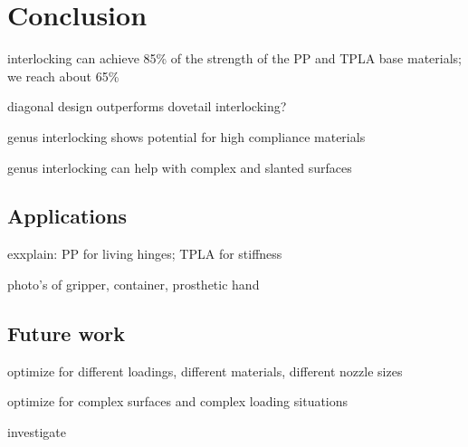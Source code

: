 \section{Conclusion}

interlocking can achieve 85\% of the strength of the PP and TPLA base materials; we reach about 65\%

diagonal design outperforms dovetail interlocking?

genus interlocking shows potential for high compliance materials

genus interlocking can help with complex and slanted surfaces 


\subsection{Applications}
exxplain: PP for living hinges; TPLA for stiffness


photo's of gripper, container, prosthetic hand 



\subsection{Future work}
optimize for different loadings, different materials, different nozzle sizes

optimize for complex surfaces and complex loading situations



investigate 